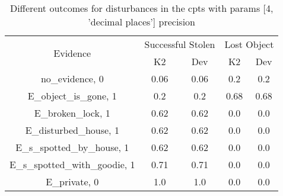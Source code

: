 \begin{table}\begin{tabular}{c|cc|cc}\toprule\multirow{2}{*}{Evidence} & \multicolumn{2}{c}{Successful Stolen} & \multicolumn{2}{c}{Lost Object} \\& {K2} & {Dev} & {K2} & {Dev} \\\midrule
no\_evidence, 0 & 0.06&0.06&0.2&0.2\\E\_object\_is\_gone, 1 & 0.2&0.2&0.68&0.68\\E\_broken\_lock, 1 & 0.62&0.62&0.0&0.0\\E\_disturbed\_house, 1 & 0.62&0.62&0.0&0.0\\E\_s\_spotted\_by\_house, 1 & 0.62&0.62&0.0&0.0\\E\_s\_spotted\_with\_goodie, 1 & 0.71&0.71&0.0&0.0\\E\_private, 0 & 1.0&1.0&0.0&0.0\\\bottomrule\end{tabular}\caption{Different outcomes for disturbances in the cpts with params [4, 'decimal places'] precision}\end{table}